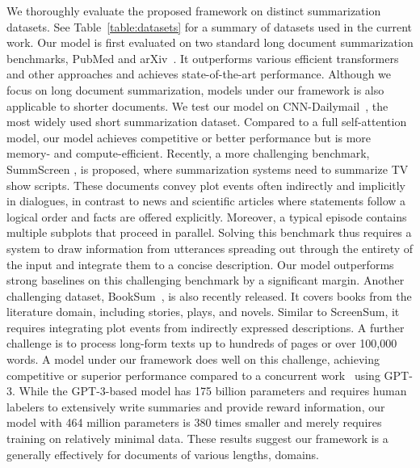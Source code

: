 We thoroughly evaluate the proposed framework on distinct summarization datasets. See Table~\ref{table:datasets} for a summary of datasets used in the current work. Our model is first evaluated on two standard long document summarization benchmarks, PubMed and arXiv~\citep{cohan-etal-2018-discourse}. It outperforms various efficient transformers and other approaches and achieves state-of-the-art performance. Although we focus on long document summarization, models under our framework is also applicable to shorter documents. We test our model on CNN-Dailymail~\citep{see-etal-2017-get}, the most widely used short summarization dataset. Compared to a full self-attention model, our model achieves competitive or better performance but is more memory- and compute-efficient. Recently, a more challenging benchmark, SummScreen \citep{chen2021summscreen}, is proposed, where summarization systems need to summarize TV show scripts. These documents convey plot events often indirectly and implicitly in dialogues, in contrast to news and scientific articles where statements follow a logical order and facts are offered explicitly. Moreover, a typical episode contains multiple subplots that proceed in parallel. Solving this benchmark thus requires a system to draw information from utterances spreading out through the entirety of the input and integrate them to a concise description. Our model outperforms strong baselines on this challenging benchmark by a significant margin. Another challenging dataset, BookSum~\citep{kryscinski2021booksum}, is also recently released. It covers books from the literature domain, including stories, plays, and novels. Similar to ScreenSum, it requires integrating plot events from indirectly expressed descriptions. A further challenge is to process long-form texts up to hundreds of pages or over 100,000 words. A model under our framework does well on this challenge, achieving competitive or superior performance compared to a concurrent work~\citep{wu2021recursively} using GPT-3. While the GPT-3-based model has 175 billion parameters and requires human labelers to extensively write summaries and provide reward information, our model with 464 million parameters is 380 times smaller and merely requires training on relatively minimal data. These results suggest our framework is a generally effectively for documents of various lengths, domains. 


